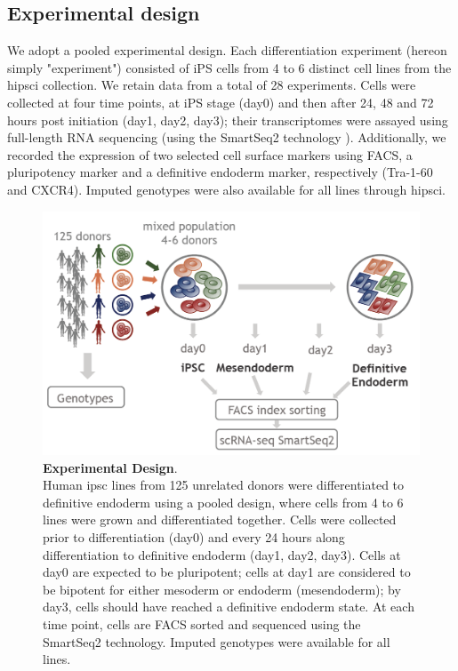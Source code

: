 \subsection{Experimental design}

We adopt a pooled experimental design.
Each differentiation experiment (hereon simply "experiment") consisted of iPS cells from 4 to 6 distinct cell lines from the \gls{hipsci} collection.
We retain data from a total of 28 experiments.
Cells were collected at four time points, at iPS stage (day0) and then after 24, 48 and 72 hours post initiation (day1, day2, day3); their transcriptomes were assayed using full-length RNA sequencing (using the SmartSeq2 technology \cite{picelli2013smart}).
Additionally, we recorded the expression of two selected cell surface markers using FACS, a pluripotency marker and a definitive endoderm marker, respectively (Tra-1-60 and CXCR4).
Imputed genotypes were also available for all lines through \gls{hipsci}.

\begin{figure}[h]
\centering
\includegraphics[width=12cm]{Chapter4/Fig/endodiff_experimental_design.png}
\caption[\textbf{Experimental Design}]{\textbf{Experimental Design}.\\
Human \gls{ipsc} lines from 125 unrelated donors were differentiated to definitive endoderm using a pooled design, where cells from 4 to 6 lines were grown and differentiated together.
Cells were collected prior to differentiation (day0) and every 24 hours along differentiation to definitive endoderm (day1, day2, day3).
Cells at day0 are expected to be pluripotent; cells at day1 are considered to be bipotent for either mesoderm or endoderm (mesendoderm); by day3, cells should have reached a definitive endoderm state.
At each time point, cells are FACS sorted and sequenced using the SmartSeq2 technology.
Imputed genotypes were available for all lines.}
\label{fig:endodiff_experimental_design}
\end{figure}

